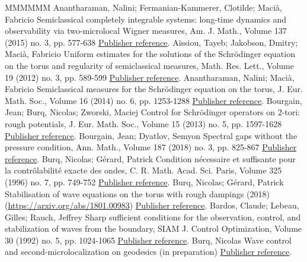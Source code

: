 \begin{thebibliography}{MMMMMM}
 Anantharaman, Nalini; Fermanian-Kammerer, Clotilde; Macià, Fabricio Semiclassical completely integrable systems: long-time dynamics and observability via two-microlocal Wigner measures, Am. J. Math., Volume 137 (2015) no. 3, pp. 577-638 \href{https://ahl.centre-mersenne.org/item/AHL_2019__2__331_0/#AFM}{Publisher reference}.
 Aïssiou, Tayeb; Jakobson, Dmitry; Macià, Fabricio Uniform estimates for the solutions of the Schrödinger equation on the torus and regularity of semiclassical measures, Math. Res. Lett., Volume 19 (2012) no. 3, pp. 589-599 \href{https://ahl.centre-mersenne.org/item/AHL_2019__2__331_0/#AJM}{Publisher reference}.
 Anantharaman, Nalini; Macià, Fabricio Semiclassical measures for the Schrödinger equation on the torus, J. Eur. Math. Soc., Volume 16 (2014) no. 6, pp. 1253-1288 \href{https://ahl.centre-mersenne.org/item/AHL_2019__2__331_0/#AM}{Publisher reference}.
 Bourgain, Jean; Burq, Nicolas; Zworski, Maciej Control for Schrödinger operators on 2-tori: rough potentials, J. Eur. Math. Soc., Volume 15 (2013) no. 5, pp. 1597-1628 \href{https://ahl.centre-mersenne.org/item/AHL_2019__2__331_0/#BBZ}{Publisher reference}.
 Bourgain, Jean; Dyatlov, Semyon Spectral gaps without the pressure condition, Ann. Math., Volume 187 (2018) no. 3, pp. 825-867 \href{https://ahl.centre-mersenne.org/item/AHL_2019__2__331_0/#BD}{Publisher reference}.
 Burq, Nicolas; Gérard, Patrick Condition nécessaire et suffisante pour la contrôlabilité exacte des ondes, C. R. Math. Acad. Sci. Paris, Volume 325 (1996) no. 7, pp. 749-752 \href{https://ahl.centre-mersenne.org/item/AHL_2019__2__331_0/#BG}{Publisher reference}.
 Burq, Nicolas; Gérard, Patrick Stabilisation of wave equations on the torus with rough dampings (2018) (\url{https://arxiv.org/abs/1801.00983}) \href{https://ahl.centre-mersenne.org/item/AHL_2019__2__331_0/#Bu16}{Publisher reference}.
 Bardos, Claude; Lebeau, Gilles; Rauch, Jeffrey Sharp sufficient conditions for the observation, control, and stabilization of waves from the boundary, SIAM J. Control Optimization, Volume 30 (1992) no. 5, pp. 1024-1065 \href{https://ahl.centre-mersenne.org/item/AHL_2019__2__331_0/#BLR}{Publisher reference}.
 Burq, Nicolas Wave control and second-microlocalization on geodesics (in preparation) \href{https://ahl.centre-mersenne.org/item/AHL_2019__2__331_0/#Bu17}{Publisher reference}.

\end{thebibliography}
